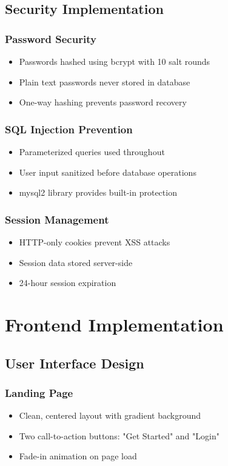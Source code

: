 \documentclass[12pt,a4paper]{article}
\begin{document}
\subsection{Security Implementation}

\subsubsection{Password Security}
\begin{itemize}
    \item Passwords hashed using bcrypt with 10 salt rounds
    \item Plain text passwords never stored in database
    \item One-way hashing prevents password recovery
\end{itemize}

\subsubsection{SQL Injection Prevention}
\begin{itemize}
    \item Parameterized queries used throughout
    \item User input sanitized before database operations
    \item mysql2 library provides built-in protection
\end{itemize}

\subsubsection{Session Management}
\begin{itemize}
    \item HTTP-only cookies prevent XSS attacks
    \item Session data stored server-side
    \item 24-hour session expiration
\end{itemize}

\section{Frontend Implementation}

\subsection{User Interface Design}

\subsubsection{Landing Page}
\begin{itemize}
    \item Clean, centered layout with gradient background
    \item Two call-to-action buttons: "Get Started" and "Login"
    \item Fade-in animation on page load
\end{itemize}
\end{document}
